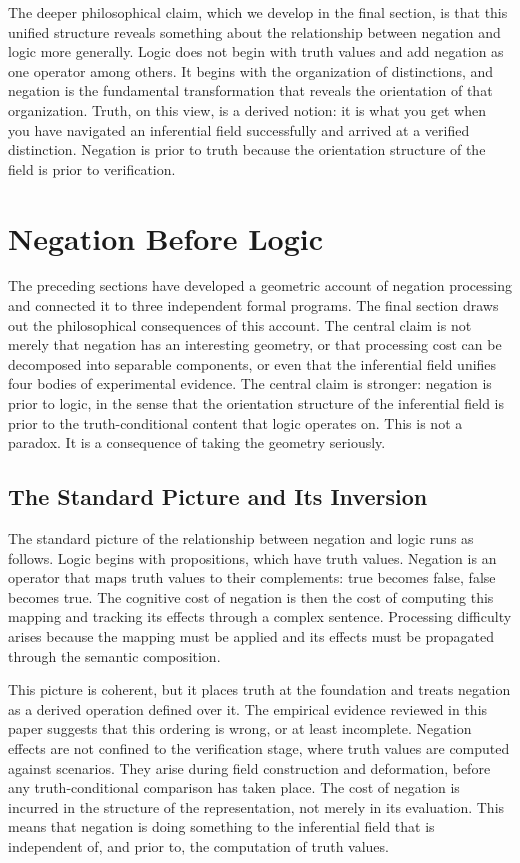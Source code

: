 \documentclass[12pt]{article}
\theoremstyle{remark}
\begin{document}
The deeper philosophical claim, which we develop in the final section,
is that this unified structure reveals something about the relationship
between negation and logic more generally. Logic does not begin with
truth values and add negation as one operator among others. It begins
with the organization of distinctions, and negation is the fundamental
transformation that reveals the orientation of that organization. Truth,
on this view, is a derived notion: it is what you get when you have
navigated an inferential field successfully and arrived at a verified
distinction. Negation is prior to truth because the orientation structure
of the field is prior to verification.

\section{Negation Before Logic}

The preceding sections have developed a geometric account of negation
processing and connected it to three independent formal programs. The
final section draws out the philosophical consequences of this account.
The central claim is not merely that negation has an interesting
geometry, or that processing cost can be decomposed into separable
components, or even that the inferential field unifies four bodies of
experimental evidence. The central claim is stronger: negation is prior
to logic, in the sense that the orientation structure of the inferential
field is prior to the truth-conditional content that logic operates on.
This is not a paradox. It is a consequence of taking the geometry
seriously.

\subsection{The Standard Picture and Its Inversion}

The standard picture of the relationship between negation and logic runs
as follows. Logic begins with propositions, which have truth values.
Negation is an operator that maps truth values to their complements:
true becomes false, false becomes true. The cognitive cost of negation
is then the cost of computing this mapping and tracking its effects
through a complex sentence. Processing difficulty arises because the
mapping must be applied and its effects must be propagated through the
semantic composition.

This picture is coherent, but it places truth at the foundation and
treats negation as a derived operation defined over it. The empirical
evidence reviewed in this paper suggests that this ordering is wrong,
or at least incomplete. Negation effects are not confined to the
verification stage, where truth values are computed against scenarios.
They arise during field construction and deformation, before any
truth-conditional comparison has taken place. The cost of negation is
incurred in the structure of the representation, not merely in its
evaluation. This means that negation is doing something to the
inferential field that is independent of, and prior to, the computation
of truth values.
\end{document}
